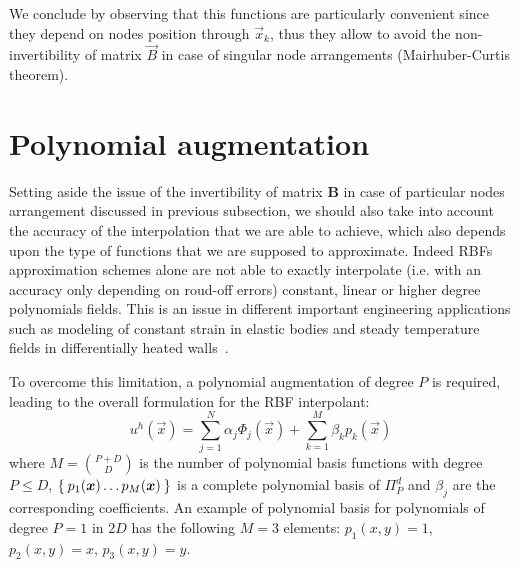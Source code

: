 We conclude by observing that this functions are particularly convenient since they depend on nodes position through $\vec{x}_k$, thus they allow to avoid the non-invertibility of matrix $\vec{B}$ in case of singular node arrangements (Mairhuber-Curtis theorem).



\section{Polynomial augmentation}

Setting aside the issue of the invertibility of matrix $\boldsymbol{B}$ in case of particular nodes arrangement discussed in previous subsection, we should also take into account  the accuracy of the interpolation that we are able to achieve, which also depends upon the type of functions that we are supposed to approximate.
Indeed RBFs approximation schemes alone are not able to exactly interpolate (i.e. with an accuracy only depending on roud-off errors) constant, linear or higher degree polynomials fields. This is an issue in different important engineering applications such as modeling of constant strain in elastic bodies and steady temperature fields in differentially heated walls~\cite{Zamolo:phd_thesis}.

To overcome this limitation, a polynomial augmentation of degree $P$ is required, leading to the overall formulation for the RBF interpolant:
\begin{equation}
	\label{eqn:RBF_interpolator_plus_polynomial_augmentation}
	u^h(\vec{x}) = \sum_{j=1}^{N} \alpha_j \Phi_j(\vec{x}) + \sum_{k=1}^{M} \beta_k p_k(\vec{x})
\end{equation}
where $M=\binom{P+D}{D}$ is the number of polynomial basis functions with degree $P \le D$, $\Set{p_1(\boldsymbol{x}) \dots p_M({\boldsymbol{x}})}$ is a complete polynomial basis of $\Pi_P^d$ and $\beta_j$ are the corresponding coefficients. An example of polynomial basis for polynomials of degree $P=1$ in $2D$ has the following $M=3$ elements: $p_1(x,y) = 1$, $p_2(x,y) = x$, $p_3(x,y) = y$.

